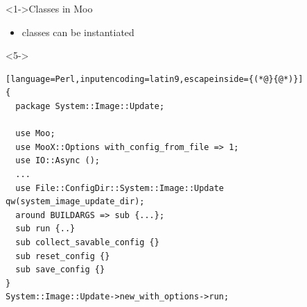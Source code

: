 \documentclass[ngerman,xcolor={table,dvipsnames},smaller,compress,hyperref={bookmarks,colorlinks}]{beamer}%
\begin{document}
\begin{frame}[t,fragile]

\begin{block}<1->{Classes in Moo}
\begin{itemize}
\item classes can be instantiated
\end{itemize}
\end{block}

\begin{block}<5->{}
\scriptsize
\begin{lstlisting}[language=Perl,inputencoding=latin9,escapeinside={(*@}{@*)}]
{
  package System::Image::Update;

  use Moo;
  use MooX::Options with_config_from_file => 1;
  use IO::Async ();
  ...
  use File::ConfigDir::System::Image::Update qw(system_image_update_dir);
  around BUILDARGS => sub {...};
  sub run {..}
  sub collect_savable_config {}
  sub reset_config {}
  sub save_config {}
}
System::Image::Update->new_with_options->run;
\end{lstlisting}
\end{block}

\end{frame}
\end{document}
